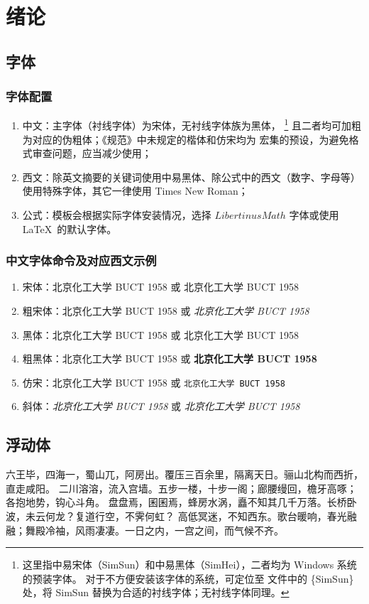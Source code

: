 \chapter{绪论}
\section{字体}
\subsection{字体配置}
\begin{enumerate}
	\item 中文：主字体（衬线字体）为宋体，无衬线字体族为黑体，%
	\footnote{这里指中易宋体（SimSun）和中易黑体（SimHei），二者均为 Windows 系统的预装字体。
	对于不方便安装该字体的系统，可定位至 
	文件中的 \{SimSun\} 处，将 SimSun 替换为合适的衬线字体；无衬线字体同理。}
	且二者均可加粗为对应的伪粗体；《规范》中未规定的楷体和仿宋均为  宏集的预设，为避免格式审查问题，应当减少使用；
	\item 西文：除英文摘要的关键词使用中易黑体、除公式中的西文（数字、字母等）使用特殊字体，其它一律使用 Times New Roman；
	\item 公式：模板会根据实际字体安装情况，选择 $LibertinusMath$ 字体或使用 \LaTeX\ 的默认字体。
\end{enumerate}

\subsection{中文字体命令及对应西文示例}
\begin{enumerate}
	\item 宋体：北京化工大学 BUCT 1958 或 \textrm{北京化工大学 BUCT 1958}
	\item 粗宋体：{\bfsong 北京化工大学 BUCT 1958} 或 \emph{北京化工大学 BUCT 1958}
	\item 黑体：{\heiti 北京化工大学 BUCT 1958} 或 \textsf{北京化工大学 BUCT 1958}
	\item 粗黑体：{\bfhei 北京化工大学 BUCT 1958} 或 \textsf{\bfseries 北京化工大学 BUCT 1958}
	\item 仿宋：{\ttfamily 北京化工大学 BUCT 1958} 或 \texttt{北京化工大学 BUCT 1958}
	\item 斜体：{\itshape 北京化工大学 BUCT 1958} 或 \textit{北京化工大学 BUCT 1958}
\end{enumerate}

\section{浮动体}
六王毕，四海一，蜀山兀，阿房出。覆压三百余里，隔离天日。骊山北构而西折，直走咸阳。
二川溶溶，流入宫墙。五步一楼，十步一阁；廊腰缦回，檐牙高啄；各抱地势，钩心斗角。
盘盘焉，囷囷焉，蜂房水涡，矗不知其几千万落。长桥卧波，未云何龙？复道行空，不霁何虹？
高低冥迷，不知西东。歌台暖响，春光融融；舞殿冷袖，风雨凄凄。一日之内，一宫之间，而气候不齐。


